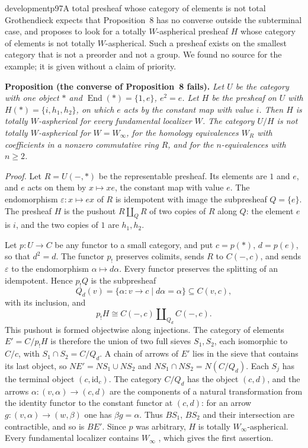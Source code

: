 \begin{dcomment}{development}{p97}{A total presheaf whose category of elements is not total}
Grothendieck expects that Proposition~8 has no converse outside the subterminal case, and proposes to look for a totally $W$-aspherical presheaf $H$ whose category of elements is not totally $W$-aspherical. Such a presheaf exists on the smallest category that is not a preorder and not a group. We found no source for the example; it is given without a claim of priority.

\textbf{Proposition (the converse of Proposition~8 fails).}\ours
\textit{Let $U$ be the category with one object $*$ and $\operatorname{End}(*)=\{1,e\}$, $e^2=e$. Let $H$ be the presheaf on $U$ with $H(*)=\{i,h_1,h_2\}$, on which $e$ acts by the constant map with value $i$. Then $H$ is totally $W$-aspherical for every fundamental localizer $W$. The category $U/H$ is not totally $W$-aspherical for $W=W_\infty$, for the homology equivalences $W_R$ with coefficients in a nonzero commutative ring $R$, and for the $n$-equivalences with $n\geq2$.}

\textit{Proof.}
Let $R=U(-,*)$ be the representable presheaf. Its elements are $1$ and $e$, and $e$ acts on them by $x\mapsto xe$, the constant map with value $e$. The endomorphism $\varepsilon:x\mapsto ex$ of $R$ is idempotent with image the subpresheaf $Q=\{e\}$. The presheaf $H$ is the pushout $R\amalg_QR$ of two copies of $R$ along $Q$: the element $e$ is $i$, and the two copies of $1$ are $h_1,h_2$.

Let $p:U\to C$ be any functor to a small category, and put $c=p(*)$, $d=p(e)$, so that $d^2=d$. The functor $p_!$ preserves colimits, sends $R$ to $C(-,c)$, and sends $\varepsilon$ to the endomorphism $\alpha\mapsto d\alpha$. Every functor preserves the splitting of an idempotent. Hence $p_!Q$ is the subpresheaf
\[
 Q_d(v)=\{\alpha:v\to c\mid d\alpha=\alpha\}\subseteq C(v,c),
\]
with its inclusion, and
\[
 p_!H\cong C(-,c)\amalg_{Q_d}C(-,c).
\]
This pushout is formed objectwise along injections. The category of elements $E'=C/p_!H$ is therefore the union of two full sieves $S_1,S_2$, each isomorphic to $C/c$, with $S_1\cap S_2=C/Q_d$. A chain of arrows of $E'$ lies in the sieve that contains its last object, so $NE'=NS_1\cup NS_2$ and $NS_1\cap NS_2=N(C/Q_d)$. Each $S_j$ has the terminal object $(c,\mathrm{id}_c)$. The category $C/Q_d$ has the object $(c,d)$, and the arrows $\alpha:(v,\alpha)\to(c,d)$ are the components of a natural transformation from the identity functor to the constant functor at $(c,d)$: for an arrow $g:(v,\alpha)\to(w,\beta)$ one has $\beta g=\alpha$. Thus $BS_1$, $BS_2$ and their intersection are contractible, and so is $BE'$. Since $p$ was arbitrary, $H$ is totally $W_\infty$-aspherical. Every fundamental localizer contains $W_\infty$ \citep[Th\'eor\`eme~2.2.11]{Cisinski2004Minimal}, which gives the first assertion.


\end{dcomment}
